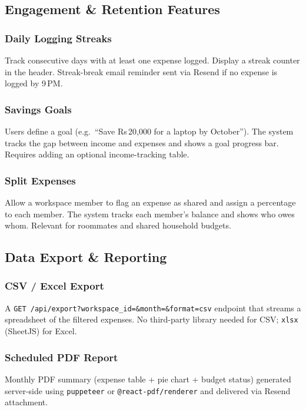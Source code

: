 \documentclass[11pt,a4paper]{article}
\begin{document}
\subsection{Engagement \& Retention Features}

\subsubsection*{Daily Logging Streaks}
Track consecutive days with at least one expense logged. Display a streak
counter in the header. Streak-break email reminder sent via Resend if no
expense is logged by 9\,PM.

\subsubsection*{Savings Goals}
Users define a goal (e.g.\ ``Save Rs\,20,000 for a laptop by October''). The
system tracks the gap between income and expenses and shows a goal progress bar.
Requires adding an optional income-tracking table.

\subsubsection*{Split Expenses}
Allow a workspace member to flag an expense as shared and assign a percentage
to each member. The system tracks each member's balance and shows who owes whom.
Relevant for roommates and shared household budgets.

\subsection{Data Export \& Reporting}

\subsubsection*{CSV / Excel Export}
A \texttt{GET /api/export?workspace\_id=\&month=\&format=csv} endpoint that
streams a spreadsheet of the filtered expenses. No third-party library needed
for CSV; \texttt{xlsx} (SheetJS) for Excel.

\subsubsection*{Scheduled PDF Report}
Monthly PDF summary (expense table + pie chart + budget status) generated
server-side using \texttt{puppeteer} or \texttt{@react-pdf/renderer} and
delivered via Resend attachment.
\end{document}
